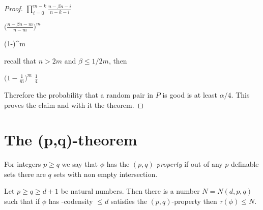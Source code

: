 \documentclass[sputnik.tex]{subfiles}
\begin{document}
\begin{proof}
\medrel{\ge}
$\displaystyle\prod^{m-k}_{i=0}\frac{n-\beta n-i}{n-k-i}$

\medrel{\ge}
$\displaystyle\bigg(\frac{n-\beta n-m}{n-m}\bigg)^m$

\ceq{}{=}
{\bigg(1-\bigg)^m}

\smallskip recall that $n>2m$ and $\beta\le1/2m$, then

\medrel{=}
$\displaystyle\bigg(1-\frac{1}{m}\bigg)^m$
\medrel{\ge}
$\displaystyle\frac{1}{4}$

Therefore the probability that a random pair in $P$ is good is at least $\alpha/4$.
This proves the claim and with it the theorem.
\end{proof}


\section{The (p,q)-theorem}

For integers $p\ge q$ we say that $\phi$ has the \emph{$(p,q)$-property\/} if out of any $p$ definable sets there are $q$ sets with non empty intersection.

\begin{theorem} Let $p\ge q\ge d+1$ be natural numbers.
Then there is a number $N=N(d,p,q)$ such that if $\phi$ has \vc-codensity $\le d$  satisfies the $(p,q)$-property then $\tau(\phi)\le N$.
\end{theorem}
\end{document}
